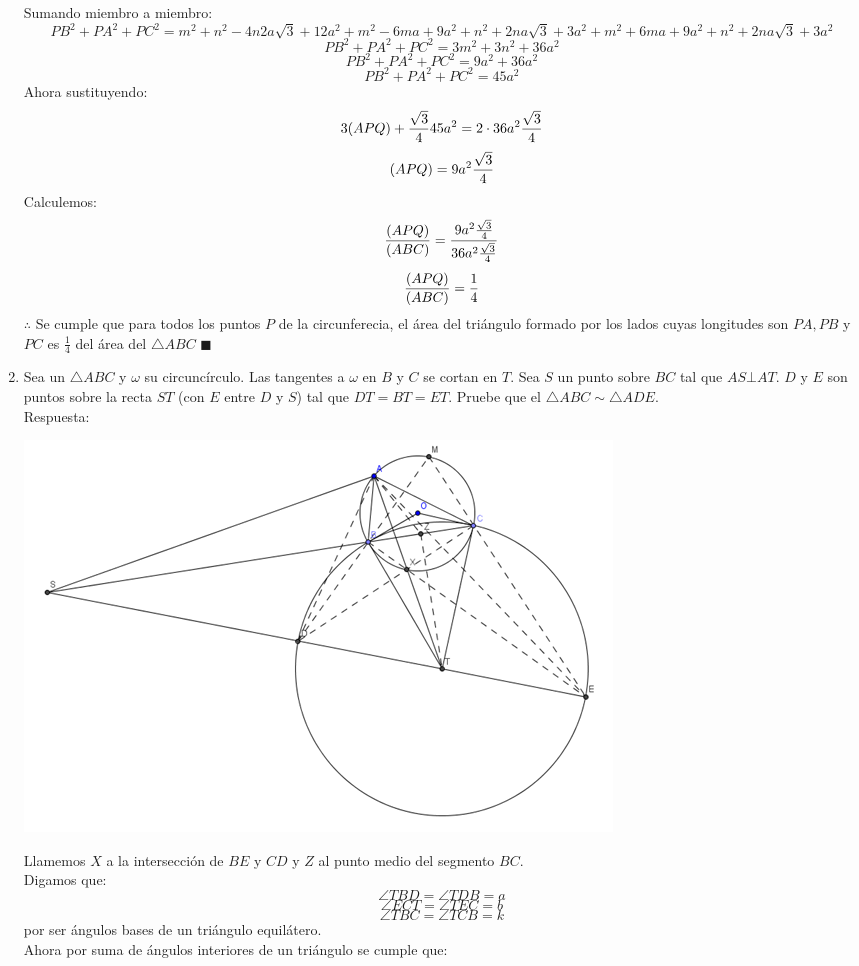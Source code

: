 \documentclass{book}
\begin{document}
\begin{enumerate}
\begin{center}
					\end{center}
Sumando miembro a miembro:
$$PB^2+PA^2+PC^2=m^2+n^2-4n2a\sqrt{3}+12a^2+m^2-6ma+9a^2+n^2+2na\sqrt{3}+3a^2+m^2+6ma+9a^2+n^2+2na\sqrt{3}+3a^2$$
$$PB^2+PA^2+PC^2=3m^2+3n^2+36a^2$$
$$PB^2+PA^2+PC^2=9a^2+36a^2$$
$$PB^2+PA^2+PC^2=45a^2$$
Ahora sustituyendo:
$$3(APQ)+{\sqrt{3}\over 4}45a^2=2\cdot 36a^2  {\sqrt{3}\over 4}$$
$$(APQ)=9a^2 {\sqrt{3}\over 4}$$
Calculemos:
$$\frac{(APQ)}{(ABC)}=\frac{9a^2  {\sqrt{3}\over 4}}{36a^2  {\sqrt{3}\over 4}}$$
$$\frac{(APQ)}{(ABC)}={1\over 4}$$
$\therefore$ Se cumple que para todos los puntos $P$ de la circunferecia, el área del triángulo formado por los lados cuyas longitudes son $PA, PB$ y $PC$ es $\displaystyle{\frac{1}{4}}$ del área del $\triangle ABC$ $\blacksquare$\\ 
				\item Sea un $\triangle ABC$ y $\omega$ su circuncírculo. Las tangentes a $\omega$ en $B$ y $C$ se cortan en $T$. Sea $S$ un punto sobre $BC$ tal que $AS \bot AT$. $D$ y $E$ son puntos sobre la recta $ST$ (con $E$ entre $D$ y $S$) tal que $DT = BT =ET$. Pruebe que el $\triangle ABC\sim\triangle ADE$. \\
					Respuesta:
					\begin{center}
							\includegraphics[scale=1]{imagenes/Geometria/25,1.png}
					\end{center}
					Llamemos $X$ a la intersección de $BE$ y $CD$ y $Z$ al punto medio del segmento $BC$.\\
Digamos que:
$$\angle TBD=\angle TDB=a$$
$$\angle ECT=\angle TEC=b$$
$$\angle TBC=\angle TCB=k$$
por ser ángulos bases de un triángulo equilátero.\\ 
Ahora por suma de ángulos interiores de un triángulo se cumple que:

\end{enumerate}
\end{document}
